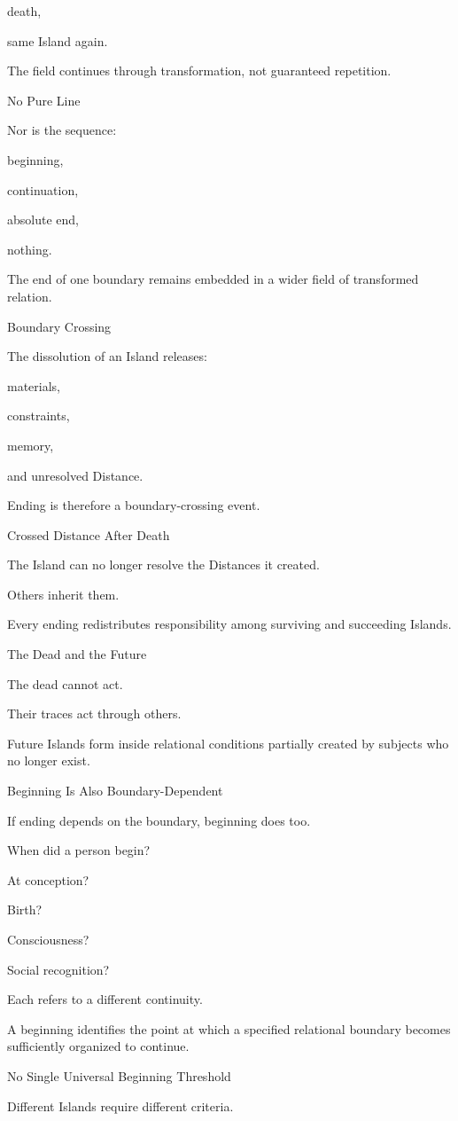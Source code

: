 death,

same Island again.

The field continues through transformation, not guaranteed repetition.

No Pure Line

Nor is the sequence:

beginning,

continuation,

absolute end,

nothing.

The end of one boundary remains embedded in a wider field of transformed relation.

Boundary Crossing

The dissolution of an Island releases:

materials,

constraints,

memory,

and unresolved Distance.

Ending is therefore a boundary-crossing event.

Crossed Distance After Death

The Island can no longer resolve the Distances it created.

Others inherit them.

Every ending redistributes responsibility among surviving and succeeding Islands.

The Dead and the Future

The dead cannot act.

Their traces act through others.

Future Islands form inside relational conditions partially created by subjects who no longer exist.

Beginning Is Also Boundary-Dependent

If ending depends on the boundary, beginning does too.

When did a person begin?

At conception?

Birth?

Consciousness?

Social recognition?

Each refers to a different continuity.

A beginning identifies the point at which a specified relational boundary becomes sufficiently organized to continue.

No Single Universal Beginning Threshold

Different Islands require different criteria.

